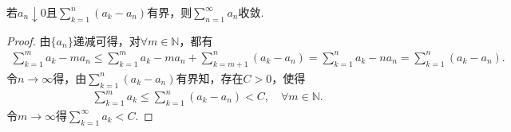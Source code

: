 \documentclass[../../main.tex]{subfiles}
\begin{document}
\begin{proposition}
若$a_n \downarrow 0$且$\sum_{k=1}^n \left( a_k - a_n \right)$有界，则$\sum_{n=1}^{\infty} a_n$收敛.
\end{proposition}
\begin{proof}
由$\{a_n\}$递减可得，对$\forall m \in \mathbb{N}$，都有
\begin{align*}
\sum_{k=1}^m a_k - m a_n \leqslant \sum_{k=1}^m a_k - m a_n + \sum_{k=m+1}^n \left( a_k - a_n \right) = \sum_{k=1}^n a_k - n a_n = \sum_{k=1}^n \left( a_k - a_n \right).
\end{align*}
令$n \rightarrow \infty$得，由$\sum_{k=1}^n \left( a_k - a_n \right)$有界知，存在$C > 0$，使得
\begin{align*}
\sum_{k=1}^m a_k \leqslant \sum_{k=1}^n \left( a_k - a_n \right) < C, \quad \forall m \in \mathbb{N}.
\end{align*}
令$m \rightarrow \infty$得$\sum_{k=1}^{\infty} a_k < C$.
\end{proof}
\end{document}
